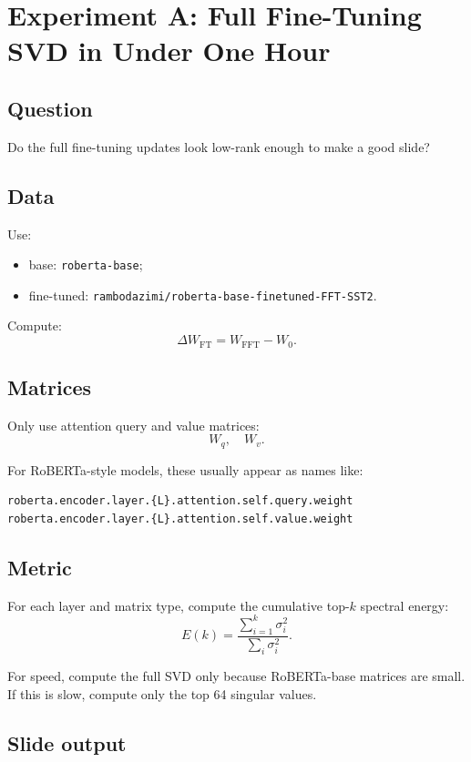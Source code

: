 \documentclass[11pt]{article}
\begin{document}
\section{Experiment A: Full Fine-Tuning SVD in Under One Hour}

\subsection{Question}

Do the full fine-tuning updates look low-rank enough to make a good slide?

\subsection{Data}

Use:
\begin{itemize}
    \item base: \texttt{roberta-base};
    \item fine-tuned: \texttt{rambodazimi/roberta-base-finetuned-FFT-SST2}.
\end{itemize}

Compute:
\[
\Delta W_{\mathrm{FT}} = W_{\mathrm{FFT}} - W_0.
\]

\subsection{Matrices}

Only use attention query and value matrices:
\[
W_q, \quad W_v.
\]

For RoBERTa-style models, these usually appear as names like:
\begin{verbatim}
roberta.encoder.layer.{L}.attention.self.query.weight
roberta.encoder.layer.{L}.attention.self.value.weight
\end{verbatim}

\subsection{Metric}

For each layer and matrix type, compute the cumulative top-$k$ spectral energy:
\[
E(k) = \frac{\sum_{i=1}^{k}\sigma_i^2}{\sum_i \sigma_i^2}.
\]

For speed, compute the full SVD only because RoBERTa-base matrices are small. If this is slow, compute only the top 64 singular values.

\subsection{Slide output}
\end{document}
